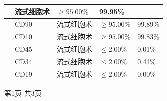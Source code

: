 \documentclass[UTF8,10pt,a4paper,fontset=fandol]{ctexart}
\newcommand{\fieldvalue}[1]{#1}
\begin{document}
\begin{tabularx}{\textwidth}{|>{\centering\arraybackslash}p{1.7cm}|>{\centering\arraybackslash}p{1.8cm}|>{\centering\arraybackslash}p{2.7cm}|X|X|}
&
\fieldvalue{流式细胞术}
&
\fieldvalue{$\geq 95.00\%$}
&
\fieldvalue{99.95\%}
\\
\cline{2-5}
&
\fieldvalue{CD90}
&
\fieldvalue{流式细胞术}
&
\fieldvalue{$\geq 95.00\%$}
&
\fieldvalue{99.89\%}
\\
\cline{2-5}
&
\fieldvalue{CD10}
&
\fieldvalue{流式细胞术}
&
\fieldvalue{$\geq 95.00\%$}
&
\fieldvalue{99.83\%}
\\
\cline{2-5}
&
\fieldvalue{CD45}
&
\fieldvalue{流式细胞术}
&
\fieldvalue{$\leq 2.00\%$}
&
\fieldvalue{0.01\%}
\\
\cline{2-5}
&
\fieldvalue{CD34}
&
\fieldvalue{流式细胞术}
&
\fieldvalue{$\leq 2.00\%$}
&
\fieldvalue{0.41\%}
\\
\cline{2-5}
&
\fieldvalue{CD19}
&
\fieldvalue{流式细胞术}
&
\fieldvalue{$\leq 2.00\%$}
&
\fieldvalue{0.00\%}
\\
\hline
\end{tabularx}

\normalsize
\begin{center}
第1页 共3页
\end{center}

\end{document}
